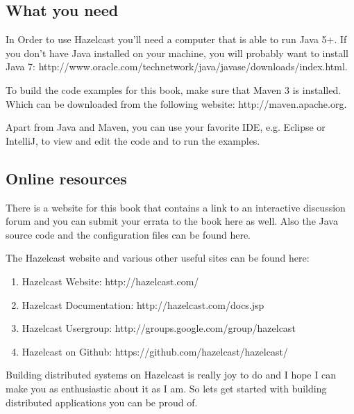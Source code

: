 \subsection*{What you need}
In Order to use Hazelcast you'll need a computer that is able to run Java 5+. If you don't have Java installed on your machine, you will probably want to install Java 7: 
http://www.oracle.com/technetwork/java/javase/downloads/index.html. 

To build the code examples for this book, make sure that Maven 3 is installed. Which can be downloaded from the following website: http://maven.apache.org.

Apart from Java and Maven, you can use your favorite IDE, e.g. Eclipse or IntelliJ, to view and edit the code and to run the examples. 

\subsection*{Online resources}
There is a website for this book that contains a link to an interactive discussion forum and you can submit your errata to the book here as well. Also the Java source code and the configuration files can be found here. 

The Hazelcast website and various other useful sites can be found here:
\begin{enumerate}
\item Hazelcast Website: http://hazelcast.com/
\item Hazelcast Documentation: http://hazelcast.com/docs.jsp
\item Hazelcast Usergroup: http://groups.google.com/group/hazelcast
\item Hazelcast on Github: https://github.com/hazelcast/hazelcast/
\end{enumerate}
Building distributed systems on Hazelcast is really joy to do and I hope I can make you as enthusiastic about it as I am. So lets get started with building distributed applications you can be proud of.
